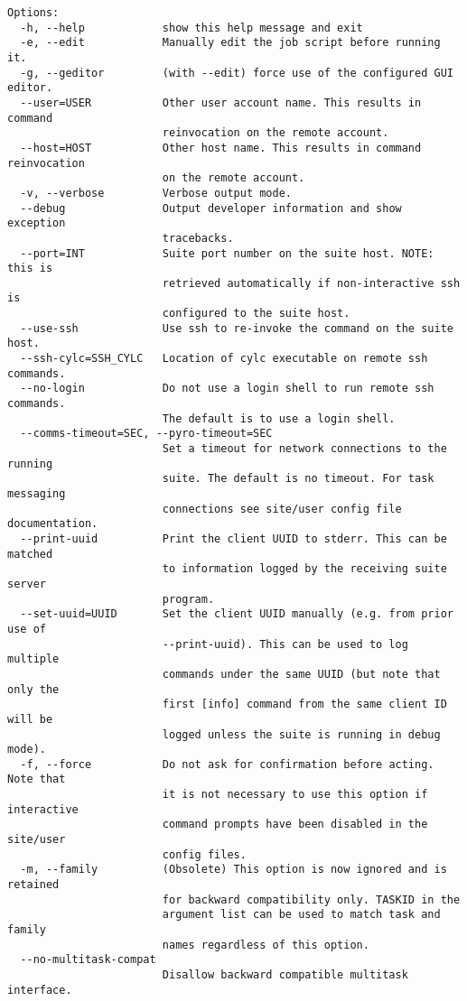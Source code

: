 \begin{lstlisting}
Options:
  -h, --help            show this help message and exit
  -e, --edit            Manually edit the job script before running it.
  -g, --geditor         (with --edit) force use of the configured GUI editor.
  --user=USER           Other user account name. This results in command
                        reinvocation on the remote account.
  --host=HOST           Other host name. This results in command reinvocation
                        on the remote account.
  -v, --verbose         Verbose output mode.
  --debug               Output developer information and show exception
                        tracebacks.
  --port=INT            Suite port number on the suite host. NOTE: this is
                        retrieved automatically if non-interactive ssh is
                        configured to the suite host.
  --use-ssh             Use ssh to re-invoke the command on the suite host.
  --ssh-cylc=SSH_CYLC   Location of cylc executable on remote ssh commands.
  --no-login            Do not use a login shell to run remote ssh commands.
                        The default is to use a login shell.
  --comms-timeout=SEC, --pyro-timeout=SEC
                        Set a timeout for network connections to the running
                        suite. The default is no timeout. For task messaging
                        connections see site/user config file documentation.
  --print-uuid          Print the client UUID to stderr. This can be matched
                        to information logged by the receiving suite server
                        program.
  --set-uuid=UUID       Set the client UUID manually (e.g. from prior use of
                        --print-uuid). This can be used to log multiple
                        commands under the same UUID (but note that only the
                        first [info] command from the same client ID will be
                        logged unless the suite is running in debug mode).
  -f, --force           Do not ask for confirmation before acting. Note that
                        it is not necessary to use this option if interactive
                        command prompts have been disabled in the site/user
                        config files.
  -m, --family          (Obsolete) This option is now ignored and is retained
                        for backward compatibility only. TASKID in the
                        argument list can be used to match task and family
                        names regardless of this option.
  --no-multitask-compat
                        Disallow backward compatible multitask interface.
\end{lstlisting}
